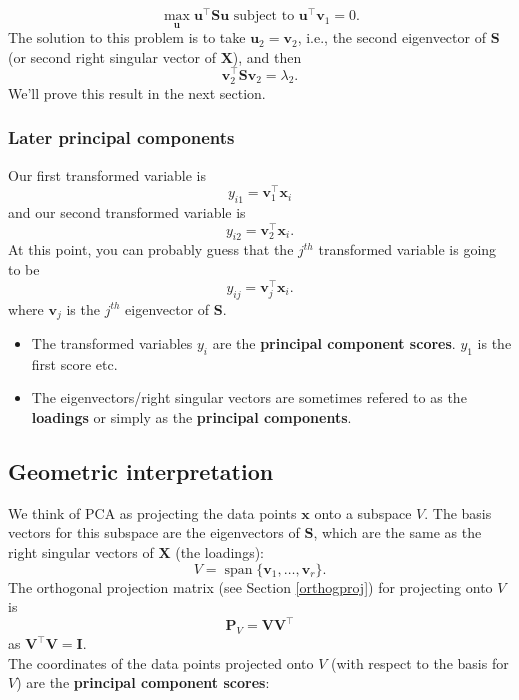 \documentclass[]{book}
\providecommand{\tightlist}{%
  \setlength{\itemsep}{0pt}\setlength{\parskip}{0pt}}
\theoremstyle{definition}
\theoremstyle{definition}
\theoremstyle{definition}
\theoremstyle{remark}
\begin{document}
\[\max_{\boldsymbol u} \boldsymbol u^\top \boldsymbol S\boldsymbol u\mbox{ subject to } \boldsymbol u^\top \boldsymbol v_1=0.\]
The solution to this problem is to take \(\boldsymbol u_2 = \boldsymbol v_2\), i.e., the second eigenvector of \(\boldsymbol S\) (or second right singular vector of \(\boldsymbol X\)), and then \[\boldsymbol v_2^\top \boldsymbol S\boldsymbol v_2=\lambda_2.\]
We'll prove this result in the next section.

\hypertarget{later-principal-components}{%
\subsubsection*{Later principal components}\label{later-principal-components}}

Our first transformed variable is
\[y_{i1}= \boldsymbol v_1^\top \boldsymbol x_i\]
and our second transformed variable is
\[y_{i2}= \boldsymbol v_2^\top \boldsymbol x_i.\]
At this point, you can probably guess that the \(j^{th}\) transformed variable is going to be
\[y_{ij}= \boldsymbol v_j^\top \boldsymbol x_i.\]
where \(\boldsymbol v_j\) is the \(j^{th}\) eigenvector of \(\boldsymbol S\).

\begin{itemize}
\tightlist
\item
  The transformed variables \(y_{i}\) are the \textbf{principal component scores}. \(y_1\) is the first score etc.
\item
  The eigenvectors/right singular vectors are sometimes refered to as the \textbf{loadings} or simply as the \textbf{principal components}.
\end{itemize}

\hypertarget{geometric-interpretation-1}{%
\subsection{Geometric interpretation}\label{geometric-interpretation-1}}

We think of PCA as projecting the data points \(\boldsymbol x\) onto a subspace \(V\). The basis vectors for this subspace are the eigenvectors of \(\boldsymbol S\), which are the same as the right singular vectors of \(\boldsymbol X\) (the loadings):
\[V=\operatorname{span}\{\boldsymbol v_1, \ldots, \boldsymbol v_r\}.\]
The orthogonal projection matrix (see Section \ref{orthogproj}) for projecting onto \(V\) is
\[\boldsymbol P_V = \boldsymbol V\boldsymbol V^\top\]
as \(\boldsymbol V^\top \boldsymbol V=\mathbf I\).\\
The coordinates of the data points projected onto \(V\) (with respect to the basis for \(V\)) are the \textbf{principal component scores}:
\end{document}
